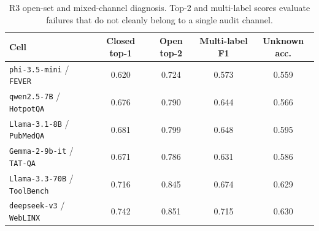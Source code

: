\begin{table}[!ht]
\centering
\caption{\small R3 open-set and mixed-channel diagnosis. Top-2 and multi-label scores evaluate failures that do not cleanly belong to a single audit channel.}
\label{tab:r3_open_mixed}
\scriptsize
\begin{tabular}{l|cccc}
\toprule
Cell & Closed top-1 & Open top-2 & Multi-label F1 & Unknown acc. \\
\midrule
\texttt{phi-3.5-mini} / \texttt{FEVER} & 0.620 & 0.724 & 0.573 & 0.559 \\
\texttt{qwen2.5-7B} / \texttt{HotpotQA} & 0.676 & 0.790 & 0.644 & 0.566 \\
\texttt{Llama-3.1-8B} / \texttt{PubMedQA} & 0.681 & 0.799 & 0.648 & 0.595 \\
\texttt{Gemma-2-9b-it} / \texttt{TAT-QA} & 0.671 & 0.786 & 0.631 & 0.586 \\
\texttt{Llama-3.3-70B} / \texttt{ToolBench} & 0.716 & 0.845 & 0.674 & 0.629 \\
\texttt{deepseek-v3} / \texttt{WebLINX} & 0.742 & 0.851 & 0.715 & 0.630 \\
\bottomrule
\end{tabular}
\end{table}
